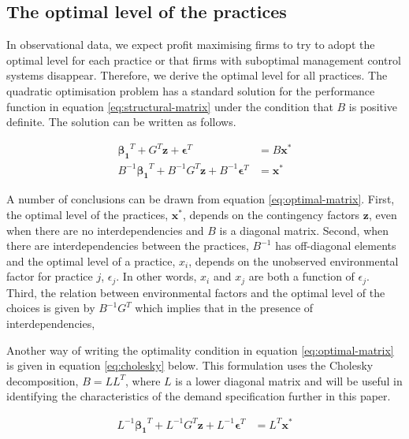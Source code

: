 \documentclass[12pt]{article}
\begin{document}
\subsection{The optimal level of the practices}\label{optimal-practices}

In observational data, we expect profit maximising firms to try to adopt the optimal level for each practice or that firms with suboptimal management control systems disappear. Therefore, we derive the optimal level for all practices. The quadratic optimisation problem has a standard solution for the performance function in equation \eqref{eq:structural-matrix} under the condition that $B$ is positive definite. The solution can be written as follows.

\begin{equation} \label{eq:optimal-matrix}
\begin{aligned} 
    \mathbf{\beta_1}^T + G^T \mathbf{z} + \mathbf{\epsilon}^T & = B \mathbf{x^*} \\
    B^{-1} \mathbf{\beta_1}^T + B^{-1} G^T \mathbf{z} + B^{-1} \mathbf{\epsilon}^T & = \mathbf{x^*}
\end{aligned}
\end{equation}

A number of conclusions can be drawn from equation \eqref{eq:optimal-matrix}. First, the optimal level of the practices, $\mathbf{x^*}$, depends on the contingency factors $\mathbf{z}$, even when there are no interdependencies and $B$ is a diagonal matrix. Second, when there are interdependencies between the practices, $B^{-1}$ has off-diagonal elements and the optimal level of a practice, $x_i$, depends on the unobserved environmental factor for practice $j$, $\epsilon_j$. In other words, $x_i$ and $x_j$ are both a function of $\epsilon_j$. Third, the relation between environmental factors and the optimal level of the choices is given by $B^{-1} G^T$ which implies that in the presence of interdependencies, 

Another way of writing the optimality condition in equation \eqref{eq:optimal-matrix} is given in equation \eqref{eq:cholesky} below. This formulation uses the Cholesky decomposition, $B = LL^T$, where $L$ is a lower diagonal matrix and will be useful in identifying the characteristics of the demand specification further in this paper.

\begin{equation} \label{eq:cholesky}
\begin{aligned} 
    L^{-1} \mathbf{\beta_1}^T + L^{-1} G^T \mathbf{z} + L^{-1} \mathbf{\epsilon}^T & = L^T \mathbf{x^*} 
\end{aligned}
\end{equation}
\end{document}

